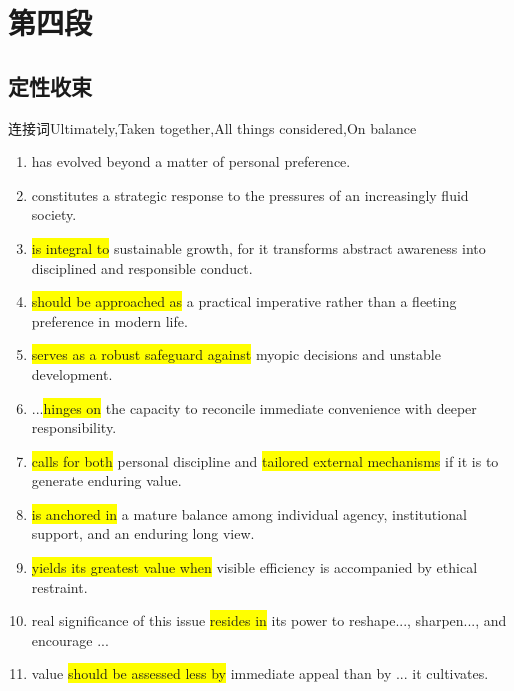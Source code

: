 ﻿\documentclass[lang=cn,11pt]{elegantbook}
\begin{document}
\section{第四段}

\subsection{定性收束}
连接词Ultimately,Taken together,All things considered,On balance
\begin{enumerate}
    \item has evolved beyond a matter of personal preference.
    \item constitutes a strategic response to the pressures of an increasingly fluid society.
    \item \colorbox{yellow}{is integral to} sustainable growth, for it transforms abstract awareness into disciplined and responsible conduct.
    \item \colorbox{yellow}{should be approached as} a practical imperative rather than a fleeting preference in modern life.
    \item \colorbox{yellow}{serves as a robust safeguard against} myopic decisions and unstable development.
    \item ...\colorbox{yellow}{hinges on} the capacity to reconcile immediate convenience with deeper responsibility.
    \item \colorbox{yellow}{calls for both} personal discipline and \colorbox{yellow}{tailored external mechanisms} if it is to generate enduring value.
    \item \colorbox{yellow}{is anchored in} a mature balance among individual agency, institutional support, and an enduring long view.
    \item \colorbox{yellow}{yields its greatest value when} visible efficiency is accompanied by ethical restraint.
    \item real significance of this issue \colorbox{yellow}{resides in} its power to reshape..., sharpen..., and encourage ...
    \item value \colorbox{yellow}{should be assessed less by} immediate appeal than by ... it cultivates.
\end{enumerate}
\end{document}
